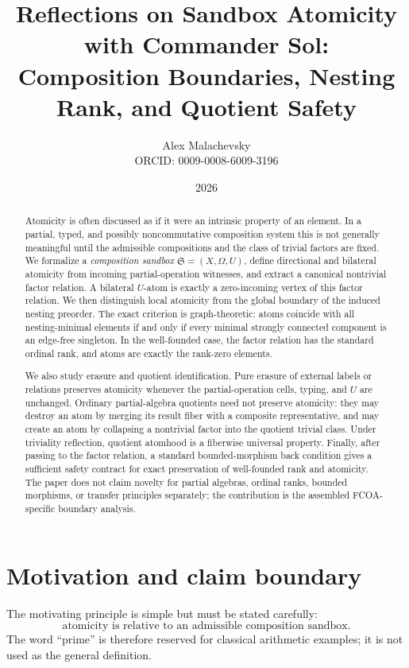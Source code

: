 \documentclass[11pt]{article}
\title{Reflections on Sandbox Atomicity with Commander Sol:\\Composition Boundaries, Nesting Rank, and Quotient Safety}
\author{Alex Malachevsky\\ORCID: 0009-0008-6009-3196}
\date{2026}
\theoremstyle{definition}
\theoremstyle{remark}
\newcommand{\Sbx}{\mathfrak S}
\begin{document}
\maketitle

\begin{abstract}
Atomicity is often discussed as if it were an intrinsic property of an element. In a partial, typed, and possibly noncommutative composition system this is not generally meaningful until the admissible compositions and the class of trivial factors are fixed. We formalize a \emph{composition sandbox} \(\Sbx=(X,\Omega,U)\), define directional and bilateral atomicity from incoming partial-operation witnesses, and extract a canonical nontrivial factor relation. A bilateral \(U\)-atom is exactly a zero-incoming vertex of this factor relation. We then distinguish local atomicity from the global boundary of the induced nesting preorder. The exact criterion is graph-theoretic: atoms coincide with all nesting-minimal elements if and only if every minimal strongly connected component is an edge-free singleton. In the well-founded case, the factor relation has the standard ordinal rank, and atoms are exactly the rank-zero elements.

We also study erasure and quotient identification. Pure erasure of external labels or relations preserves atomicity whenever the partial-operation cells, typing, and \(U\) are unchanged. Ordinary partial-algebra quotients need not preserve atomicity: they may destroy an atom by merging its result fiber with a composite representative, and may create an atom by collapsing a nontrivial factor into the quotient trivial class. Under triviality reflection, quotient atomhood is a fiberwise universal property. Finally, after passing to the factor relation, a standard bounded-morphism back condition gives a sufficient safety contract for exact preservation of well-founded rank and atomicity. The paper does not claim novelty for partial algebras, ordinal ranks, bounded morphisms, or transfer principles separately; the contribution is the assembled FCOA-specific boundary analysis.
\end{abstract}

\section{Motivation and claim boundary}

The motivating principle is simple but must be stated carefully:
\begin{equation}
\boxed{\text{atomicity is relative to an admissible composition sandbox}.}
\label{eq:thesis}
\end{equation}
The word ``prime'' is therefore reserved for classical arithmetic examples; it is not used as the general definition.
\end{document}
